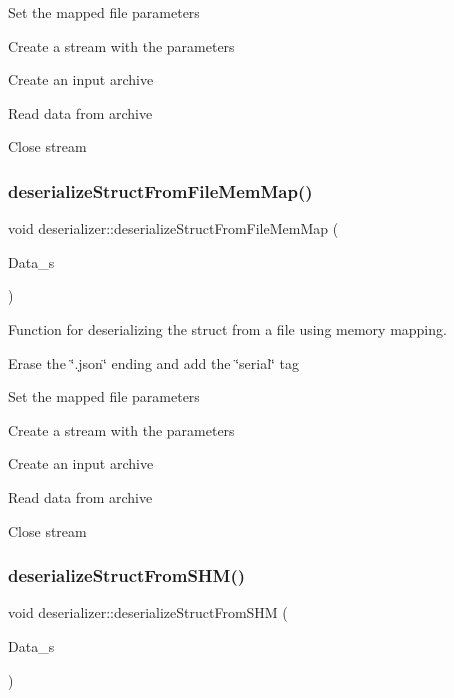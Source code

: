 Set the mapped file parameters

Create a stream with the parameters

Create an input archive

Read data from archive

Close stream \mbox{\label{classdeserializer_ac2d58e3468d72863414cfd8c9bdcd323}} 
\subsubsection{\texorpdfstring{deserialize\+Struct\+From\+File\+Mem\+Map()}{deserializeStructFromFileMemMap()}\hspace{0.1cm}{\footnotesize\ttfamily [2/2]}}
{\footnotesize\ttfamily void deserializer\+::deserialize\+Struct\+From\+File\+Mem\+Map (\begin{DoxyParamCaption}\item[{\hyperlink{structEXMPLE__s}{E\+X\+M\+P\+L\+E\+\_\+s} $\ast$}]{Data\+\_\+s }\end{DoxyParamCaption})}



Function for deserializing the struct from a file using memory mapping. 

Erase the \char`\"{}.\+json\char`\"{} ending and add the \char`\"{}serial\char`\"{} tag

Set the mapped file parameters

Create a stream with the parameters

Create an input archive

Read data from archive

Close stream \mbox{\label{classdeserializer_a551670afd582e6223efe33f8915dff68}} 
\subsubsection{\texorpdfstring{deserialize\+Struct\+From\+S\+H\+M()}{deserializeStructFromSHM()}\hspace{0.1cm}{\footnotesize\ttfamily [1/2]}}
{\footnotesize\ttfamily void deserializer\+::deserialize\+Struct\+From\+S\+HM (\begin{DoxyParamCaption}\item[{\hyperlink{structUMGR__s}{U\+M\+G\+R\+\_\+s} $\ast$}]{Data\+\_\+s }\end{DoxyParamCaption})}



